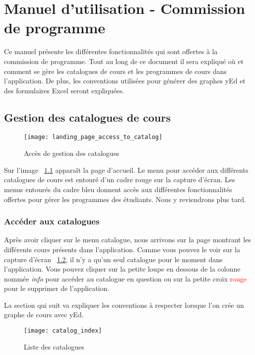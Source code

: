 \label{AppendixA}
\chapter{Manuel d'utilisation - Commission de programme}
Ce manuel présente les différentes fonctionnalités qui sont offertes à la commission de programme. Tout au long de ce document il sera expliqué où et comment se gère les catalogues de cours et les programmes de cours dans l'application. De plus, les conventions utilisées pour générer des graphes yEd et des formulaires Excel seront expliquées. 
\section{Gestion des catalogues de cours}
\begin{figure}[htb]
\centering
\texttt{[image: landing\_page\_access\_to\_catalog]}
\caption{Accès de gestion des catalogues}
\label{fig:landing_page_catalog}
\end{figure}

Sur l'image ~\ref{fig:landing_page_catalog} apparaît la page d'accueil. Le menu pour accéder aux différents catalogues de cours est entouré d'un cadre rouge sur la capture d'écran. Les menus entourés du cadre bleu donnent accès aux différentes fonctionnalités offertes pour gérer les programmes des étudiants. Nous y reviendrons plus tard. 

\subsection{Accéder aux catalogues}
Après avoir cliquer sur le menu catalogue, nous arrivons sur la page montrant les différents cours présents dans l'application. Comme vous pouvez le voir sur la capture d'écran ~\ref{fig:catalog_index}, il n'y a qu'un seul catalogue pour le moment dans l'application. Vous pouvez cliquer sur la petite loupe en dessous de la colonne nommée \textit{info} pour accéder au catalogue en question ou sur la petite croix \textcolor{red}{rouge} pour le supprimer de l'application.

La section qui suit va expliquer les conventions à respecter lorsque l'on crée un graphe de cours avec yEd.

\begin{figure}[htb]
\centering
\caption{Liste des catalogues}
\label{fig:catalog_index}
\texttt{[image: catalog\_index]}
\end{figure}

